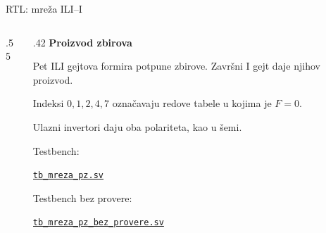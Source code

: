 \begin{frame}[label=02-s022-rtl01]{RTL: mreža ILI–I}
\setlength{\parskip}{0pt}

\begin{columns}[T,onlytextwidth]
\begin{column}{.55\textwidth}

\end{column}
\begin{column}{.42\textwidth}
\fontsize{10}{12}\selectfont
\textbf{Proizvod zbirova}\par\vspace{2mm}
Pet ILI gejtova formira potpune zbirove. Završni I gejt daje njihov proizvod.\par\vspace{2mm}
Indeksi \(0,1,2,4,7\) označavaju redove tabele u kojima je \(F=0\).\par\vspace{2mm}
Ulazni invertori daju oba polariteta, kao u šemi.
\par\vspace{2mm}
{\fontsize{9}{11}\selectfont
Testbench:\par
\href{https://github.com/pznikola/digitalna_elektronika_1/blob/main/predavanja/02_sinteza_kombinacionih_mreza/kodovi/primeri_sv/02-s022/tb_mreza_pz.sv}{\texttt{tb\_mreza\_pz.sv}}\par
Testbench bez provere:\par
\href{https://github.com/pznikola/digitalna_elektronika_1/blob/main/predavanja/02_sinteza_kombinacionih_mreza/kodovi/primeri_sv/02-s022/tb_mreza_pz_bez_provere.sv}{\texttt{tb\_mreza\_pz\_bez\_provere.sv}}\par}
\end{column}
\end{columns}
\end{frame}
